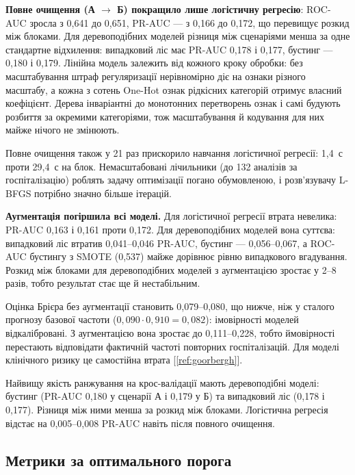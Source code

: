 \documentclass[14pt,a4paper]{extreport}
\begin{document}
\textbf{Повне очищення (А $\to$ Б) покращило лише логістичну регресію}: ROC-AUC зросла з 0,641 до 0,651, PR-AUC --- з 0,166 до 0,172, що перевищує розкид між блоками. Для деревоподібних моделей різниця між сценаріями менша за одне стандартне відхилення: випадковий ліс має PR-AUC 0,178 і 0,177, бустинг --- 0,180 і 0,179. Лінійна модель залежить від кожного кроку обробки: без масштабування штраф регуляризації нерівномірно діє на ознаки різного масштабу, а кожна з сотень One-Hot ознак рідкісних категорій отримує власний коефіцієнт. Дерева інваріантні до монотонних перетворень ознак і самі будують розбиття за окремими категоріями, тож масштабування й кодування для них майже нічого не змінюють.

Повне очищення також у 21 раз прискорило навчання логістичної регресії: 1,4~с проти 29,4~с на блок. Немасштабовані лічильники (до 132 аналізів за госпіталізацію) роблять задачу оптимізації погано обумовленою, і розв'язувачу L-BFGS потрібно значно більше ітерацій.

\textbf{Аугментація погіршила всі моделі.} Для логістичної регресії втрата невелика: PR-AUC 0,163 і 0,161 проти 0,172. Для деревоподібних моделей вона суттєва: випадковий ліс втратив 0,041--0,046 PR-AUC, бустинг --- 0,056--0,067, а ROC-AUC бустингу з SMOTE (0,537) майже дорівнює рівню випадкового вгадування. Розкид між блоками для деревоподібних моделей з аугментацією зростає у 2--8 разів, тобто результат стає ще й нестабільним.

Оцінка Брієра без аугментації становить 0,079--0,080, що нижче, ніж у сталого прогнозу базової частоти ($0{,}090 \cdot 0{,}910 = 0{,}082$): імовірності моделей відкалібровані. З аугментацією вона зростає до 0,111--0,228, тобто ймовірності перестають відповідати фактичній частоті повторних госпіталізацій. Для моделі клінічного ризику це самостійна втрата [\ref{ref:goorbergh}].

Найвищу якість ранжування на крос-валідації мають деревоподібні моделі: бустинг (PR-AUC 0,180 у сценарії А і 0,179 у Б) та випадковий ліс (0,178 і 0,177). Різниця між ними менша за розкид між блоками. Логістична регресія відстає на 0,005--0,008 PR-AUC навіть після повного очищення.

\subsection{Метрики за оптимального порога}
\label{sec:tuned}
\end{document}

